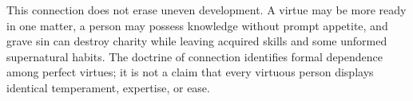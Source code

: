 This connection does not erase uneven development. A virtue may be more ready in one matter, a person may possess knowledge without prompt appetite, and grave sin can destroy charity while leaving acquired skills and some unformed supernatural habits. The doctrine of connection identifies formal dependence among perfect virtues; it is not a claim that every virtuous person displays identical temperament, expertise, or ease.
